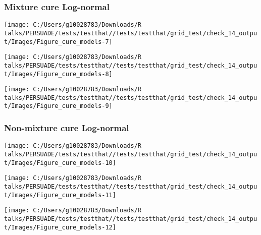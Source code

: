 \documentclass[
]{article}
\begin{document}
\clearpage

\subsubsection{Mixture cure Log-normal}\label{mixture-cure-log-normal}

\begin{flushleft}\texttt{[image: C:/Users/g10028783/Downloads/R talks/PERSUADE/tests/testthat//tests/testthat/grid\_test/check\_14\_output/Images/Figure\_cure\_models-7]} \end{flushleft}

\begin{flushleft}\texttt{[image: C:/Users/g10028783/Downloads/R talks/PERSUADE/tests/testthat//tests/testthat/grid\_test/check\_14\_output/Images/Figure\_cure\_models-8]} \end{flushleft}

\begin{flushleft}\texttt{[image: C:/Users/g10028783/Downloads/R talks/PERSUADE/tests/testthat//tests/testthat/grid\_test/check\_14\_output/Images/Figure\_cure\_models-9]} \end{flushleft}

\clearpage

\subsubsection{Non-mixture cure
Log-normal}\label{non-mixture-cure-log-normal}

\begin{flushleft}\texttt{[image: C:/Users/g10028783/Downloads/R talks/PERSUADE/tests/testthat//tests/testthat/grid\_test/check\_14\_output/Images/Figure\_cure\_models-10]} \end{flushleft}

\begin{flushleft}\texttt{[image: C:/Users/g10028783/Downloads/R talks/PERSUADE/tests/testthat//tests/testthat/grid\_test/check\_14\_output/Images/Figure\_cure\_models-11]} \end{flushleft}

\begin{flushleft}\texttt{[image: C:/Users/g10028783/Downloads/R talks/PERSUADE/tests/testthat//tests/testthat/grid\_test/check\_14\_output/Images/Figure\_cure\_models-12]} \end{flushleft}
\end{document}
